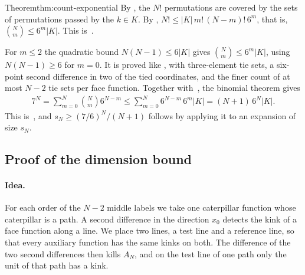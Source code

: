 \begin{Proof}{Theorem}{thm:count-exponential}
By , the $N!$ permutations are covered by the sets of
permutations passed by the $k\in K$. By ,
$N!\leq|K|\,m!\,(N-m)!\,6^m$, that is, $\binom Nm\leq6^m|K|$. This
is~.

For $m\leq2$ the quadratic bound $N(N-1)\leq6|K|$ gives
$\binom Nm\leq6^m|K|$, using $N(N-1)\geq6$ for $m=0$. It is proved like
, with three-element tie sets, a six-point second
difference in two of the tied coordinates, and the finer count of at most
$N-2$ tie sets per face function. Together with~,
the binomial theorem gives
\begin{align}\label{eq:binomial-sum}
 7^N=\sum_{m=0}^N\binom Nm6^{N-m}\leq\sum_{m=0}^N6^{N-m}\,6^m|K|=(N+1)\,6^N|K|.
\end{align}
This is~, and $s_N\geq(7/6)^N/(N+1)$ follows by
applying it to an expansion of size $s_N$.
\end{Proof}

\subsection{Proof of the dimension bound}\label{app:quotient-lower}

\paragraph{Idea.}
For each order of the $N-2$ middle labels we take one caterpillar function
whose caterpillar is a path. A second difference in the direction $x_0$
detects the kink of a face function along a line. We place two lines, a test
line and a reference line, so that every auxiliary function has the same
kinks on both. The difference of the two second differences then kills
$A_N$, and on the test line of one path only the unit of that path has a
kink.


